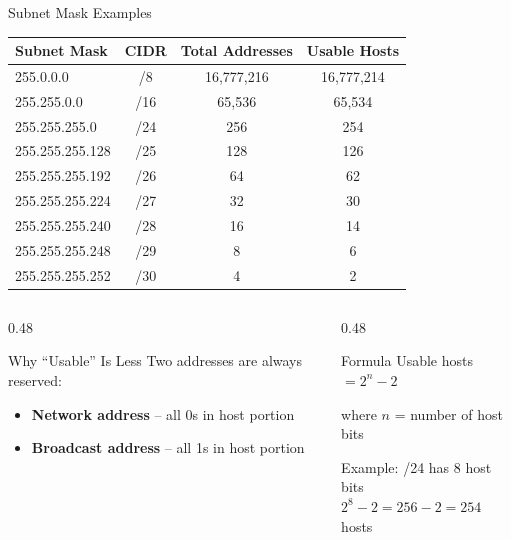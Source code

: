 \documentclass[aspectratio=169]{beamer}  %
\begin{document}
\begin{frame}[t,shrink=15]{Subnet Mask Examples}
    \begin{center}
        \begin{tabular}{l c c c}
            \toprule
            \textbf{Subnet Mask} & \textbf{CIDR} & \textbf{Total Addresses} & \textbf{Usable Hosts} \\
            \midrule
            255.0.0.0 & /8 & 16,777,216 & 16,777,214 \\
            255.255.0.0 & /16 & 65,536 & 65,534 \\
            \rowcolor{rctcblue!10}
            255.255.255.0 & /24 & 256 & 254 \\
            255.255.255.128 & /25 & 128 & 126 \\
            255.255.255.192 & /26 & 64 & 62 \\
            255.255.255.224 & /27 & 32 & 30 \\
            255.255.255.240 & /28 & 16 & 14 \\
            255.255.255.248 & /29 & 8 & 6 \\
            255.255.255.252 & /30 & 4 & 2 \\
            \bottomrule
        \end{tabular}
    \end{center}
    
    \vspace{0.3em}
    \begin{columns}[T]
        \begin{column}{0.48\textwidth}
            \begin{block}{Why ``Usable'' Is Less}
                Two addresses are always reserved:
                \begin{itemize}
                    \item \textbf{Network address} -- all 0s in host portion
                    \item \textbf{Broadcast address} -- all 1s in host portion
                \end{itemize}
            \end{block}
        \end{column}
        \begin{column}{0.48\textwidth}
            \begin{exampleblock}{Formula}
                Usable hosts $= 2^{n} - 2$
                
                where $n$ = number of host bits
                
                \vspace{0.2em}
                Example: /24 has 8 host bits \\
                $2^{8} - 2 = 256 - 2 = 254$ hosts
            \end{exampleblock}
        \end{column}
    \end{columns}
\end{frame}
\end{document}
